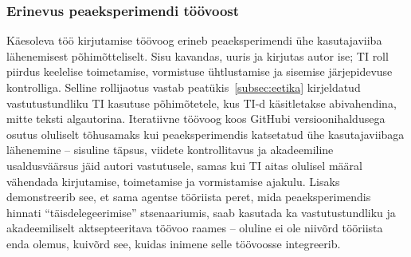 \subsubsection{Erinevus peaeksperimendi töövoost}

Käesoleva töö kirjutamise töövoog erineb peaeksperimendi ühe kasutajaviiba lähenemisest põhimõtteliselt. Sisu kavandas, uuris ja kirjutas autor ise; TI roll piirdus keelelise toimetamise, vormistuse ühtlustamise ja sisemise järjepidevuse kontrolliga. Selline rollijaotus vastab peatükis~\ref{subsec:eetika} kirjeldatud vastutustundliku TI kasutuse põhimõtetele, kus TI-d käsitletakse abivahendina, mitte teksti algautorina. Iteratiivne töövoog koos GitHubi versioonihaldusega osutus oluliselt tõhusamaks kui peaeksperimendis katsetatud ühe kasutajaviibaga lähenemine -- sisuline täpsus, viidete kontrollitavus ja akadeemiline usaldusväärsus jäid autori vastutusele, samas kui TI aitas olulisel määral vähendada kirjutamise, toimetamise ja vormistamise ajakulu. Lisaks demonstreerib see, et sama agentse tööriista peret, mida peaeksperimendis hinnati ``täisdelegeerimise'' stsenaariumis, saab kasutada ka vastutustundliku ja akadeemiliselt aktsepteeritava töövoo raames -- oluline ei ole niivõrd tööriista enda olemus, kuivõrd see, kuidas inimene selle töövoosse integreerib.
